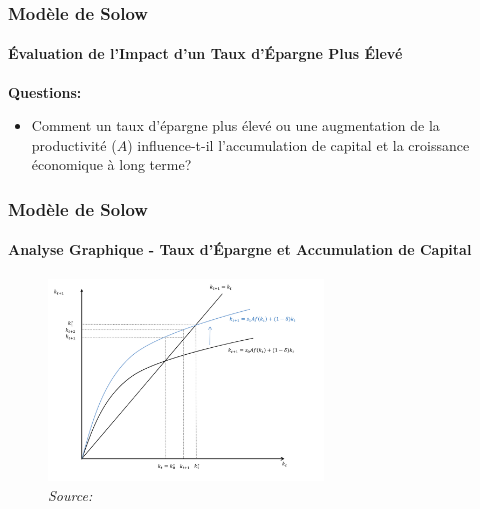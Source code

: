 \documentclass{beamer}
\begin{document}
\begin{frame}
    \frametitle{Modèle de Solow}
    \framesubtitle{Évaluation de l'Impact d'un Taux d'Épargne Plus Élevé}
    \textbf{Questions:} 
    \begin{itemize}
        \item 
        Comment un taux d'épargne plus élevé
        ou une augmentation de la productivité  (\( A \))
         influence-t-il l'accumulation de capital et 
        la croissance économique à long terme?
    \end{itemize}
\end{frame}

\begin{frame}
    \frametitle{Modèle de Solow}
    \framesubtitle{Analyse Graphique - Taux d'Épargne et Accumulation de Capital}

    \begin{figure}
        \centering
        \includegraphics[width=0.65\textwidth]{graphs/ss_solow_s2.png} %
        \caption{
            \footnotesize \textit{Source: }\textcite{Garin_etal_2021}
        }
    \end{figure}
\end{frame}
\end{document}

